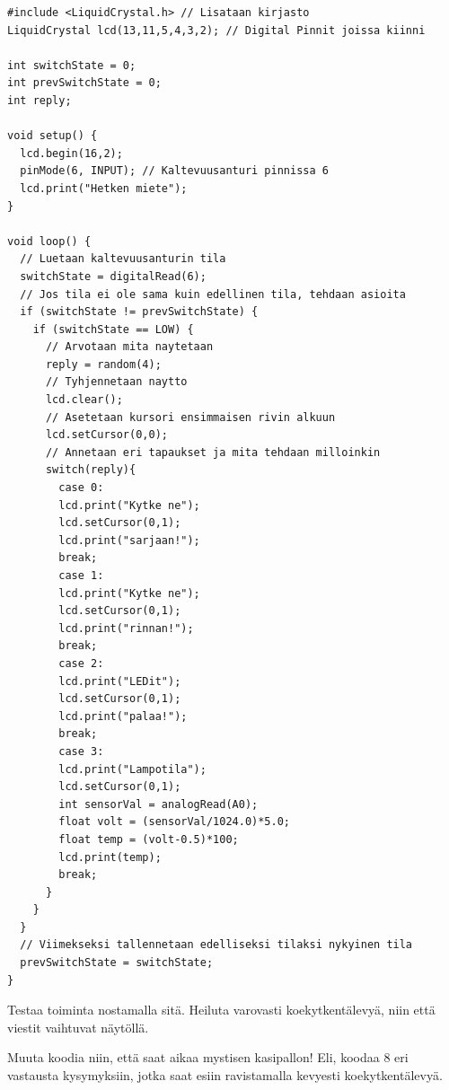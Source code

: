 \begin{lstlisting}[numbers=none]
#include <LiquidCrystal.h> // Lisataan kirjasto 
LiquidCrystal lcd(13,11,5,4,3,2); // Digital Pinnit joissa kiinni

int switchState = 0;
int prevSwitchState = 0;
int reply;

void setup() {
  lcd.begin(16,2);
  pinMode(6, INPUT); // Kaltevuusanturi pinnissa 6
  lcd.print("Hetken miete");
}

void loop() {
  // Luetaan kaltevuusanturin tila
  switchState = digitalRead(6);
  // Jos tila ei ole sama kuin edellinen tila, tehdaan asioita
  if (switchState != prevSwitchState) {
    if (switchState == LOW) {
      // Arvotaan mita naytetaan
      reply = random(4);
      // Tyhjennetaan naytto
      lcd.clear();
      // Asetetaan kursori ensimmaisen rivin alkuun
      lcd.setCursor(0,0);
      // Annetaan eri tapaukset ja mita tehdaan milloinkin
      switch(reply){
        case 0:
        lcd.print("Kytke ne");
        lcd.setCursor(0,1);
        lcd.print("sarjaan!");
        break;
        case 1:
        lcd.print("Kytke ne");
        lcd.setCursor(0,1);
        lcd.print("rinnan!");
        break;
        case 2:
        lcd.print("LEDit");
        lcd.setCursor(0,1);
        lcd.print("palaa!");
        break;
        case 3:
        lcd.print("Lampotila");
        lcd.setCursor(0,1);
        int sensorVal = analogRead(A0);
        float volt = (sensorVal/1024.0)*5.0;
        float temp = (volt-0.5)*100;
        lcd.print(temp);
        break;
      }
    }
  } 
  // Viimekseksi tallennetaan edelliseksi tilaksi nykyinen tila
  prevSwitchState = switchState;
}
\end{lstlisting}

Testaa toiminta nostamalla sitä. Heiluta varovasti koekytkentälevyä, niin että viestit vaihtuvat näytöllä.

\begin{tcolorbox}[title=Haaste!,colback=teal!10,colbacktitle=teal!90]
Muuta koodia niin, että saat aikaa mystisen kasipallon! Eli, koodaa 8 eri vastausta kysymyksiin, jotka saat esiin ravistamalla kevyesti koekytkentälevyä.
\end{tcolorbox}

